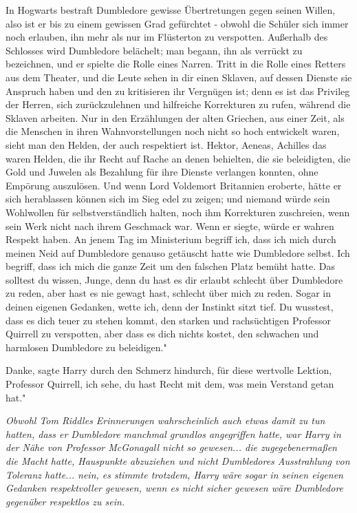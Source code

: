 \glqq{}In Hogwarts bestraft Dumbledore gewisse Übertretungen gegen seinen Willen,
also ist er bis zu einem gewissen Grad gefürchtet - obwohl die Schüler sich
immer noch erlauben, ihn mehr als nur im Flüsterton zu verspotten. Außerhalb des
Schlosses wird Dumbledore belächelt; man begann, ihn als verrückt zu bezeichnen,
und er spielte die Rolle eines Narren. Tritt in die Rolle eines Retters aus dem
Theater, und die Leute sehen in dir einen Sklaven, auf dessen Dienste sie
Anspruch haben und den zu kritisieren ihr Vergnügen ist; denn es ist das
Privileg der Herren, sich zurückzulehnen und hilfreiche Korrekturen zu rufen,
während die Sklaven arbeiten. Nur in den Erzählungen der alten Griechen, aus
einer Zeit, als die Menschen in ihren Wahnvorstellungen noch nicht so hoch
entwickelt waren, sieht man den Helden, der auch respektiert ist. Hektor,
Aeneas, Achilles das waren Helden, die ihr Recht auf Rache an denen behielten,
die sie beleidigten, die Gold und Juwelen als Bezahlung für ihre Dienste
verlangen konnten, ohne Empörung auszulösen. Und wenn Lord Voldemort Britannien
eroberte, hätte er sich herablassen können sich im Sieg edel zu zeigen; und
niemand würde sein Wohlwollen für selbstverständlich halten, noch ihm
Korrekturen zuschreien, wenn sein Werk nicht nach ihrem Geschmack war. Wenn er
siegte, würde er wahren Respekt haben. An jenem Tag im Ministerium begriff ich,
dass ich mich durch meinen Neid auf Dumbledore genauso getäuscht hatte wie
Dumbledore selbst. Ich begriff, dass ich mich die ganze Zeit um den falschen
Platz bemüht hatte. Das solltest du wissen, Junge, denn du hast es dir erlaubt
schlecht über Dumbledore zu reden, aber hast es nie gewagt hast, schlecht über
mich zu reden. Sogar in deinen eigenen Gedanken, wette ich, denn der Instinkt
sitzt tief. Du wusstest, dass es dich teuer zu stehen kommt, den starken und
rachsüchtigen Professor Quirrell zu verspotten, aber dass es dich nichts kostet,
den schwachen und harmlosen Dumbledore zu beleidigen."

\glqq{}Danke\grqq{}, sagte Harry durch den Schmerz hindurch, \glqq{}für diese
wertvolle Lektion, Professor Quirrell, ich sehe, du hast Recht mit dem, was mein
Verstand getan hat."

\emph{Obwohl Tom Riddles Erinnerungen wahrscheinlich auch etwas damit zu tun
hatten, dass er Dumbledore manchmal grundlos angegriffen hatte, war Harry in der
Nähe von Professor McGonagall nicht so gewesen... die zugegebenermaßen die Macht
hatte, Hauspunkte abzuziehen und nicht Dumbledores Ausstrahlung von Toleranz
hatte... nein, es stimmte trotzdem, Harry wäre sogar in seinen eigenen Gedanken
respektvoller gewesen, wenn es nicht sicher gewesen wäre Dumbledore gegenüber
respektlos zu sein.}

